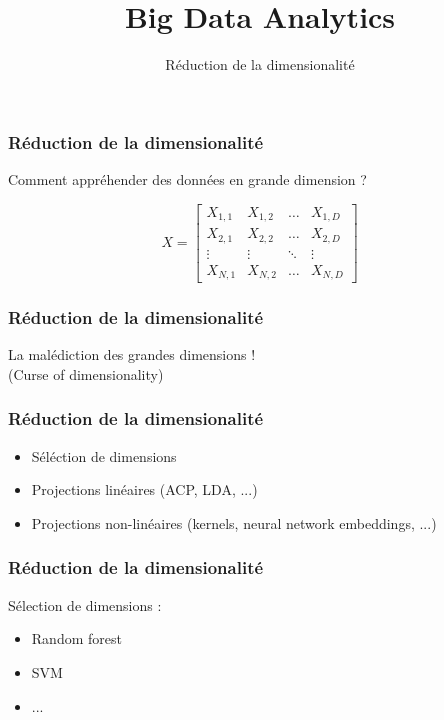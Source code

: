 \documentclass{formation}
\title{Big Data Analytics}
\subtitle{Réduction de la dimensionalité}
\begin{document}
\maketitle

\begin{frame}
  \frametitle{Réduction de la dimensionalité}
    \begin{center}
      Comment appréhender des données en grande dimension ?
    \end{center}
    \[
    X = \begin{bmatrix}
      X_{1,1} & X_{1,2} & \dots  & X_{1,D} \\
      X_{2,1} & X_{2,2} & \dots  & X_{2,D} \\
      \vdots & \vdots & \ddots & \vdots \\
      X_{N,1} & X_{N,2} & \dots  & X_{N,D}
    \end{bmatrix}
    \]
\end{frame}

\begin{frame}
  \frametitle{Réduction de la dimensionalité}
    \begin{center}
      La malédiction des grandes dimensions !\\
      (Curse of dimensionality)
    \end{center}
\end{frame}

\begin{frame}
  \frametitle{Réduction de la dimensionalité}
    \begin{itemize}
    \item Séléction de dimensions
    \item Projections linéaires (ACP, LDA, ...)
    \item Projections non-linéaires (kernels, neural network embeddings, ...)
    \end{itemize}
\end{frame}

\begin{frame}
  \frametitle{Réduction de la dimensionalité}
  Sélection de dimensions :
  \begin{itemize}
  \item Random forest
  \item SVM
  \item ...
  \end{itemize}
\end{frame}
\end{document}
